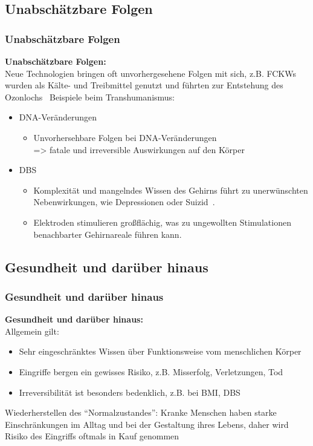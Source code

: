 \documentclass[aspectratio=169,16pt,xcolor=table]{beamer}
\begin{document}
\subsection{Unabschätzbare Folgen}
\begin{frame}
  \frametitle{Unabschätzbare Folgen}
  \textbf{Unabschätzbare Folgen:}\\
  \small Neue Technologien bringen oft unvorhergesehene Folgen mit sich, z.B. FCKWs wurden als Kälte- und Treibmittel genutzt und führten zur Entstehung des Ozonlochs~\cite{rowland1996stratospheric}
  Beispiele beim Transhumanismus:
  \begin{itemize}
    \item DNA-Veränderungen
    \begin{itemize}
      \item Unvorhersehbare Folgen bei DNA-Veränderungen\\
      => fatale und irreversible Auswirkungen auf den Körper
    \end{itemize}
    \item DBS
    \begin{itemize}
      \item Komplexität und mangelndes Wissen des Gehirns führt zu unerwünschten Nebenwirkungen, wie Depressionen oder Suizid~\cite{zarzycki2020stimulation}.
      \item Elektroden stimulieren großflächig, was zu ungewollten Stimulationen benachbarter Gehirnareale führen kann.
    \end{itemize}
  \end{itemize}
\end{frame}

\subsection{Gesundheit und darüber hinaus}
\begin{frame}
  \frametitle{Gesundheit und darüber hinaus}
  \textbf{Gesundheit und darüber hinaus:}\\
  Allgemein gilt:
  \begin{itemize}
      \item Sehr eingeschränktes Wissen über Funktionsweise vom menschlichen Körper
      \item Eingriffe bergen ein gewisses Risiko, z.B. Misserfolg, Verletzungen, Tod
      \item Irreversibilität ist besonders bedenklich, z.B. bei BMI, DBS
  \end{itemize}
  Wiederherstellen des ``Normalzustandes'':
  Kranke Menschen haben starke Einschränkungen im Alltag und bei der Gestaltung ihres Lebens, daher wird Risiko des Eingriffs oftmals in Kauf genommen
\end{frame}
\end{document}

